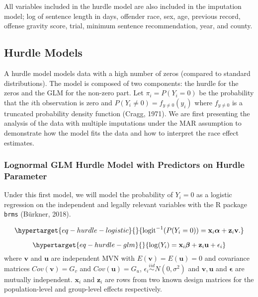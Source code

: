 \documentclass[
  letterpaper,
  DIV=11,
  numbers=noendperiod]{scrartcl}
\begin{document}
All variables included in the hurdle model are also included in the
imputation model; log of sentence length in days, offender race, sex,
age, previous record, offense gravity score, trial, minimum sentence
recommendation, year, and county.

\hypertarget{hurdle-models}{%
\subsection{Hurdle Models}\label{hurdle-models}}

A hurdle model models data with a high number of zeros (compared to
standard distributions). The model is composed of two components: the
hurdle for the zeros and the GLM for the non-zero part. Let
\(\pi_i = P(Y_i = 0)\) be the probability that the \(i\)th observation
is zero and \(P(Y_i \neq 0) = f_{y\neq 0}(y_i)\) where \(f_{y\neq 0}\)
is a truncated probability density function (Cragg, 1971). We are first
presenting the analysis of the data with multiple imputations under the
MAR assumption to demonstrate how the model fits the data and how to
interpret the race effect estimates.

\hypertarget{lognormal-glm-hurdle-model-with-predictors-on-hurdle-parameter}{%
\subsubsection{Lognormal GLM Hurdle Model with Predictors on Hurdle
Parameter}\label{lognormal-glm-hurdle-model-with-predictors-on-hurdle-parameter}}

Under this first model, we will model the probability of \(Y_i = 0\) as
a logistic regression on the independent and legally relevant variables
with the R package \texttt{brms} (Bürkner, 2018).

\begin{equation}\protect\hypertarget{eq-hurdle-logistic}{}{
\mathrm{logit}^{-1}(P(Y_i = 0)) = \mathbf{x}_i \boldsymbol{\alpha} + \mathbf{z}_i \mathbf{v}.
}\label{eq-hurdle-logistic}\end{equation}

\begin{equation}\protect\hypertarget{eq-hurdle-glm}{}{
\log(Y_i) = \mathbf{x}_i \boldsymbol{\beta} + \mathbf{z}_i \mathbf{u} + \epsilon_i
}\label{eq-hurdle-glm}\end{equation} where \(\mathbf{v}\) and
\(\mathbf{u}\) are independent MVN with
\(E(\mathbf{v}) = E(\mathbf{u}) = 0\) and covariance matrices
\(Cov(\mathbf{v}) = G_v\) and \(Cov(\mathbf{u}) = G_u\),
\(\epsilon_i \overset{iid}{\sim} N(0, \sigma^2)\) and
\(\mathbf{v}, \mathbf{u}\) and \(\boldsymbol{\epsilon}\) are mutually
independent. \(\mathbf{x}_i\) and \(\mathbf{z}_i\) are rows from two
known design matrices for the population-level and group-level effects
respectively.
\end{document}

